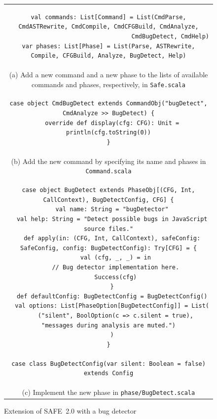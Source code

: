 \documentclass[10pt, conference]{IEEEtran}
\newcommand{\mtt}[1]{\texttt{\small #1}}
\newcommand{\safe}{{SAFE~2.0}\xspace}
\begin{document}
\setcounter{figure}{1}
\begin{figure}[t]
\centering
\begin{tabular}{c}
\begin{minipage}{.95\textwidth}
\footnotesize
\begin{verbatim}
val commands: List[Command] = List(CmdParse, CmdASTRewrite, CmdCompile, CmdCFGBuild, CmdAnalyze,
                                   CmdBugDetect, CmdHelp)
var phases: List[Phase] = List(Parse, ASTRewrite, Compile, CFGBuild, Analyze, BugDetect, Help)
\end{verbatim}
\end{minipage}
\\[1.5em]
{\small (a) Add a new command and a new phase to the lists of available
commands and phases, respectively, in \mtt{Safe.scala}}
\\[1em]
\begin{minipage}{.95\textwidth}
\footnotesize
\begin{verbatim}
case object CmdBugDetect extends CommandObj("bugDetect", CmdAnalyze >> BugDetect) {
  override def display(cfg: CFG): Unit = println(cfg.toString(0))
}
\end{verbatim}
\end{minipage}
\\[1em]
{\small (b) Add the new command by specifying its name and phases in \mtt{Command.scala}}
\\[1em]
\begin{minipage}{.95\textwidth}
\footnotesize
\begin{verbatim}
case object BugDetect extends PhaseObj[(CFG, Int, CallContext), BugDetectConfig, CFG] {
  val name: String = "bugDetector"
  val help: String = "Detect possible bugs in JavaScript source files."
  def apply(in: (CFG, Int, CallContext), safeConfig: SafeConfig, config: BugDetectConfig): Try[CFG] = {
    val (cfg, _, _) = in
    // Bug detector implementation here.
    Success(cfg)
  }
  def defaultConfig: BugDetectConfig = BugDetectConfig()
  val options: List[PhaseOption[BugDetectConfig]] = List(
    ("silent", BoolOption(c => c.silent = true), "messages during analysis are muted.")
  )
}

case class BugDetectConfig(var silent: Boolean = false) extends Config

\end{verbatim}
\end{minipage}
\\
{\small (c) Implement the new phase in \mtt{phase/BugDetect.scala}}
\end{tabular}
\caption{\small Extension of \safe with a bug detector~\cite{safewapp}}
\label{fig:extensibility}
\end{figure}
\end{document}

